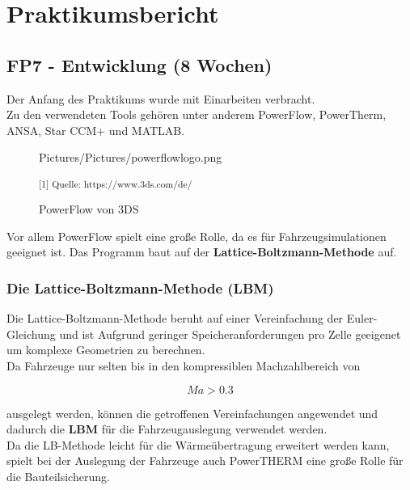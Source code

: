 \chapter{Praktikumsbericht}
\label{Bericht}

\section{FP7 - Entwicklung (8 Wochen)}
\label{FP7}

Der Anfang des Praktikums wurde mit Einarbeiten verbracht.\\
Zu den verwendeten Tools gehören unter anderem PowerFlow, PowerTherm, ANSA, Star CCM+ und MATLAB.\\

\begin{figure}[H]
	\begin{center}
		\begin{overpic}[width=\linewidth]{Pictures/Pictures/powerflowlogo.png}
			
		\end{overpic}
		\caption{PowerFlow von 3DS}
		
		\small\textsuperscript{[1] Quelle: https://www.3ds.com/de/}	
		\label{fig:powerflow}
	\end{center}
\end{figure}


Vor allem PowerFlow spielt eine große Rolle, da es für Fahrzeugsimulationen geeignet ist. Das Programm baut auf der \textbf{Lattice-Boltzmann-Methode} auf.\\

\subsection{Die Lattice-Boltzmann-Methode (LBM)}
\label{LBM}
Die Lattice-Boltzmann-Methode beruht auf einer Vereinfachung der Euler-Gleichung und ist Aufgrund geringer Speicheranforderungen pro Zelle geeigenet um komplexe Geometrien zu berechnen. \\
Da Fahrzeuge nur selten bis in den kompressiblen Machzahlbereich von 

\begin{equation}
		\label{MachEq}
	Ma > 0.3
\end{equation}

ausgelegt werden, können die getroffenen Vereinfachungen angewendet und dadurch die \textbf{LBM} für die Fahrzeugauslegung verwendet werden. \\
Da die LB-Methode leicht für die Wärmeübertragung erweitert werden kann, spielt bei der Auslegung der Fahrzeuge auch PowerTHERM eine große Rolle für die Bauteilsicherung.

